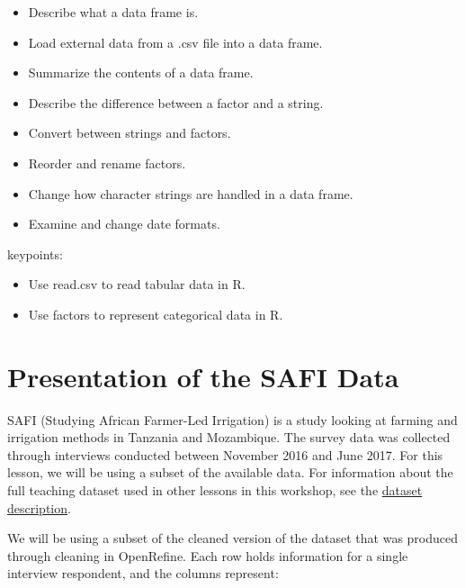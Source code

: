\documentclass[]{book}
\providecommand{\tightlist}{%
  \setlength{\itemsep}{0pt}\setlength{\parskip}{0pt}}
\begin{document}
\begin{itemize}
\tightlist
\item
  Describe what a data frame is.\\
\item
  Load external data from a .csv file into a data frame.\\
\item
  Summarize the contents of a data frame.\\
\item
  Describe the difference between a factor and a string.\\
\item
  Convert between strings and factors.\\
\item
  Reorder and rename factors.\\
\item
  Change how character strings are handled in a data frame.\\
\item
  Examine and change date formats.
\end{itemize}

keypoints:

\begin{itemize}
\tightlist
\item
  Use read.csv to read tabular data in R.\\
\item
  Use factors to represent categorical data in R.
\end{itemize}

\section{Presentation of the SAFI
Data}\label{presentation-of-the-safi-data}

SAFI (Studying African Farmer-Led Irrigation) is a study looking at
farming and irrigation methods in Tanzania and Mozambique. The survey
data was collected through interviews conducted between November 2016
and June 2017. For this lesson, we will be using a subset of the
available data. For information about the full teaching dataset used in
other lessons in this workshop, see the
\href{http://www.datacarpentry.org/socialsci-workshop/data/}{dataset
description}.

We will be using a subset of the cleaned version of the dataset that was
produced through cleaning in OpenRefine. Each row holds information for
a single interview respondent, and the columns represent:
\end{document}
